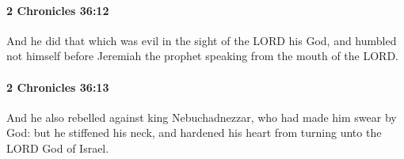 		\paragraph{2 Chronicles 36:12} %
			\label{2CHRONICLES-36-12}

			And he did that which was evil in the sight of the LORD his God, and humbled not himself before Jeremiah the prophet speaking from the mouth of the LORD.


		\paragraph{2 Chronicles 36:13} %
			\label{2CHRONICLES-36-13}

			And he also rebelled against king Nebuchadnezzar, who had made him swear by God: but he stiffened his neck, and hardened his heart from turning unto the LORD God of Israel.


